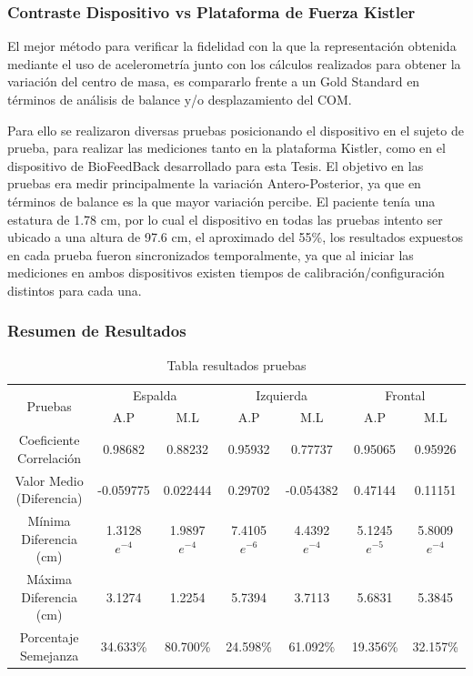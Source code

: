 \documentclass[12pt,a4paper]{article}
\begin{document}
\subsubsection{Contraste Dispositivo vs Plataforma de Fuerza Kistler}

El mejor método para verificar la fidelidad con la que la representación obtenida mediante el uso de acelerometría junto con los cálculos realizados para obtener la variación del centro de masa, es compararlo frente a un Gold Standard en términos de análisis de balance y/o desplazamiento del COM.

Para ello se realizaron diversas pruebas posicionando el dispositivo en el sujeto de prueba, para realizar las mediciones tanto en la plataforma Kistler, como en el dispositivo de BioFeedBack desarrollado para esta Tesis.
El objetivo en las pruebas era medir principalmente la variación Antero-Posterior, ya que en términos de balance es la que mayor variación percibe.
El paciente tenía una estatura de 1.78 cm, por lo cual el dispositivo en todas las pruebas intento ser ubicado a una altura de 97.6 cm, el aproximado del 55\%, los resultados expuestos en cada prueba fueron sincronizados temporalmente, ya que al iniciar las mediciones en ambos dispositivos existen tiempos de calibración/configuración distintos para cada una.

\subsubsection{Resumen de Resultados}

\begin{table}[H]
	\label{table:resultadosPruebas}
	\centering
	\begin{tabular}{|c|c|c|c|c|c|c|}
		\hline
		\multirow{2}{*}{Pruebas} &
		\multicolumn{2}{c|}{Espalda} &
		\multicolumn{2}{c|}{Izquierda} &
		\multicolumn{2}{c|}{Frontal} \\
		\cline{2-7}
		& A.P & M.L & A.P  & M.L & A.P & M.L \\
		\hline
		\shortstack{Coeficiente\\Correlación} & 0.98682 & 0.88232 & 0.95932 & 0.77737 & 0.95065 & 0.95926 \\
		\hline
		\shortstack{Valor Medio \\ (Diferencia)} & -0.059775 & 0.022444 & 0.29702 & -0.054382 & 0.47144 & 0.11151 \\
		\hline
		\shortstack{Mínima\\Diferencia (cm)} & 1.3128$e^{-4}$ & 1.9897$e^{-4}$ & 7.4105$e^{-6}$ & 4.4392$e^{-4}$ & 5.1245$e^{-5}$ & 5.8009$e^{-4}$ \\
		\hline
		\shortstack{Máxima\\Diferencia (cm)} & 3.1274 & 1.2254 & 5.7394 & 3.7113 & 5.6831 & 5.3845 \\
		\hline
		\shortstack{Porcentaje\\Semejanza} & 34.633\% & 80.700\% & 24.598\% & 61.092\% &19.356\% & 32.157\% \\
		\hline
	\end{tabular}
	\caption{Tabla resultados pruebas}
\end{table}	
  
\end{document}
